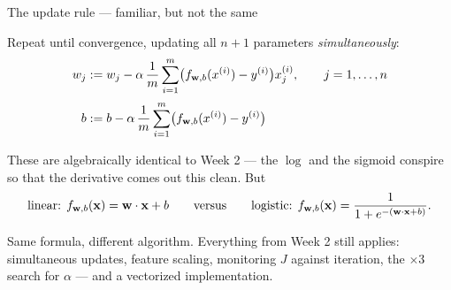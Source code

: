\documentclass[aspectratio=169,10pt]{beamer}
\begin{document}
\begin{frame}{The update rule --- familiar, but not the same}
  \begin{defnbox}
    Repeat until convergence, updating all $n+1$ parameters \emph{simultaneously}:
    \[
      \begin{aligned}
        w_j &:= w_j - \alpha\,\frac{1}{m}\sum_{i=1}^{m}
          \bigl(f_{\mathbf{w},b}(x^{(i)})-y^{(i)}\bigr)x^{(i)}_{j}, \qquad j=1,\dots,n\\[2pt]
        b &:= b - \alpha\,\frac{1}{m}\sum_{i=1}^{m}\bigl(f_{\mathbf{w},b}(x^{(i)})-y^{(i)}\bigr)
      \end{aligned}
    \]
  \end{defnbox}
  \footnotesize
  These are algebraically identical to Week 2 --- the $\log$ and the sigmoid conspire so that
  the derivative comes out this clean. But
  \[
    \text{linear: } f_{\mathbf{w},b}(\mathbf{x})=\mathbf{w}\cdot\mathbf{x}+b
    \qquad\text{versus}\qquad
    \text{logistic: } f_{\mathbf{w},b}(\mathbf{x})=\frac{1}{1+e^{-(\mathbf{w}\cdot\mathbf{x}+b)}} .
  \]
  \begin{pitfall}
    Same formula, different algorithm. Everything from Week 2 still applies: simultaneous
    updates, feature scaling, monitoring $J$ against iteration, the $\times3$ search for
    $\alpha$ --- and a vectorized implementation.
  \end{pitfall}
\end{frame}
\end{document}
